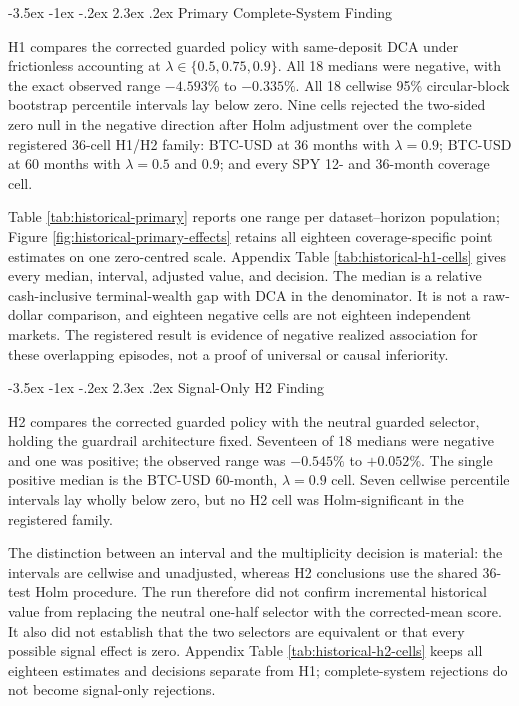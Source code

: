 \documentclass[12pt,a4paper,oneside]{report}
\makeatletter
\renewcommand\section{\@startsection{section}{1}{\z@}%
  {-3.5ex \@plus -1ex \@minus -.2ex}%
  {2.3ex \@plus .2ex}%
  {\normalfont\fontsize{14}{17}\selectfont\bfseries}}
\makeatother
\begin{document}
\section{Primary Complete-System Finding}
\label{sec:primary-complete-system}

H1 compares the corrected guarded policy with same-deposit DCA under
frictionless accounting at
$\lambda\in\{0.5,0.75,0.9\}$. All 18 medians were negative, with the exact
observed range $-4.593\%$ to $-0.335\%$. All 18 cellwise 95\% circular-block
bootstrap percentile intervals lay below zero. Nine cells rejected the
two-sided zero null in the negative direction after Holm adjustment over the
complete registered 36-cell H1/H2 family: BTC-USD at 36 months with
$\lambda=0.9$; BTC-USD at 60 months with $\lambda=0.5$ and $0.9$; and every
SPY 12- and 36-month coverage cell.



Table \ref{tab:historical-primary} reports one range per dataset--horizon
population; Figure \ref{fig:historical-primary-effects} retains all eighteen
coverage-specific point estimates on one zero-centred scale. Appendix Table
\ref{tab:historical-h1-cells} gives every median, interval, adjusted value, and
decision. The median is a relative cash-inclusive terminal-wealth gap with DCA
in the denominator. It is not a raw-dollar comparison, and eighteen negative
cells are not eighteen independent markets. The registered result is evidence
of negative realized association for these overlapping episodes, not a proof
of universal or causal inferiority.

\section{Signal-Only H2 Finding}
\label{sec:primary-signal}

H2 compares the corrected guarded policy with the neutral guarded selector,
holding the guardrail architecture fixed. Seventeen of 18 medians were
negative and one was positive; the observed range was $-0.545\%$ to
$+0.052\%$. The single positive median is the BTC-USD 60-month,
$\lambda=0.9$ cell. Seven cellwise percentile intervals lay wholly below zero,
but no H2 cell was Holm-significant in the registered family.

The distinction between an interval and the multiplicity decision is
material: the intervals are cellwise and unadjusted, whereas H2 conclusions
use the shared 36-test Holm procedure. The run therefore did not confirm
incremental historical value from replacing the neutral one-half selector
with the corrected-mean score. It also did not establish that the two selectors
are equivalent or that every possible signal effect is zero. Appendix Table
\ref{tab:historical-h2-cells} keeps all eighteen estimates and decisions
separate from H1; complete-system rejections do not become signal-only
rejections.
\end{document}
